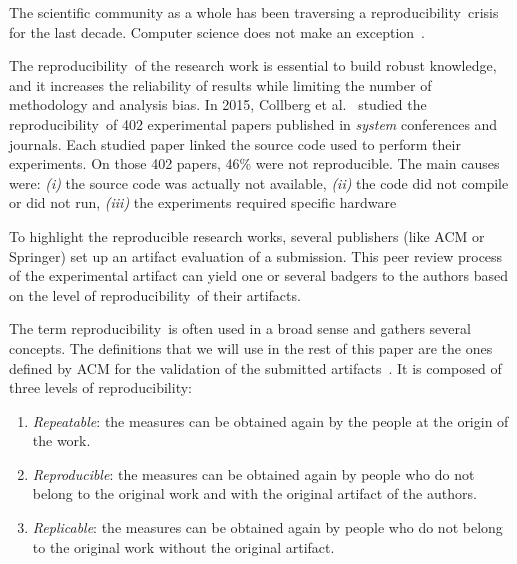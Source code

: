 \documentclass[sigconf,natbib=false]{acmart}
\newcommand{\repro}{reproducibility}
\begin{document}
The scientific community as a whole has been traversing a \repro\ crisis for the last decade.
Computer science does not make an exception\ \cite{randallIrreproducibilityCrisisModern2018,baker500ScientistsLift2016}.

The \repro\ of the research work is essential to build robust knowledge, and it increases the reliability of results while limiting the number of methodology and analysis bias.
In 2015, Collberg et al.\ \cite{collberg_repeatability_2015} studied the \repro\ of 402 experimental papers published in \emph{system} conferences and journals.
Each studied paper linked the source code used to perform their experiments. 
On those 402 papers, 46\% were not reproducible.
The main causes were:
\emph{(i)} the source code was actually not available,
\emph{(ii)} the code did not compile or did not run,
\emph{(iii)} the experiments required specific hardware

To highlight the reproducible research works, several publishers (like ACM or Springer) set up an artifact evaluation of a submission.
This peer review process of the experimental artifact can yield one or several badgers to the authors based on the level of \repro\ of their artifacts.

The term \repro\ is often used in a broad sense and gathers several concepts.
The definitions that we will use in the rest of this paper are the ones defined by ACM for the validation of the submitted artifacts\ \cite{acm-badges}.
It is composed of three levels of \repro:

\begin{enumerate}
\item \emph{Repeatable}: the measures can be obtained again by the people at the origin of the work.
\item \emph{Reproducible}: the measures can be obtained again by people who do not belong to the original work and with the original artifact of the authors.
\item \emph{Replicable}: the measures can be obtained again by people who do not belong to the original work without the original artifact.
\end{enumerate}

  
\end{document}
